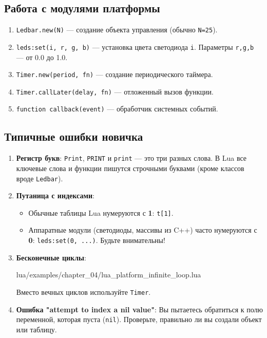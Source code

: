\subsection{Работа с модулями платформы}
\begin{enumerate}
    \item \verb|Ledbar.new(N)| — создание объекта управления (обычно \verb|N=25|).
    \item \verb|leds:set(i, r, g, b)| — установка цвета светодиода \verb|i|. Параметры \verb|r,g,b| — от 0.0 до 1.0.
    \item \verb|Timer.new(period, fn)| — создание периодического таймера.
    \item \verb|Timer.callLater(delay, fn)| — отложенный вызов функции.
    \item \verb|function callback(event)| — обработчик системных событий.
\end{enumerate}

\subsection{Типичные ошибки новичка}
\begin{enumerate}
    \item \textbf{Регистр букв}: \texttt{Print}, \texttt{PRINT} и \texttt{print} — это три разных слова. В Lua все ключевые слова и функции пишутся строчными буквами (кроме классов вроде \texttt{Ledbar}).
    \item \textbf{Путаница с индексами}:
    \begin{itemize}
        \item Обычные таблицы Lua нумеруются с \textbf{1}: \texttt{t[1]}.
        \item Аппаратные модули (светодиоды, массивы из C++) часто нумеруются с \textbf{0}: \texttt{leds:set(0, ...)}. Будьте внимательны!
    \end{itemize}
    \item \textbf{Бесконечные циклы}:
    \begin{codefile}{lua/examples/chapter_04/lua_platform_infinite_loop.lua}
    \end{codefile}
    Вместо вечных циклов используйте \texttt{Timer}.
    \item \textbf{Ошибка "attempt to index a nil value"}: Вы пытаетесь обратиться к полю переменной, которая пуста (\texttt{nil}). Проверьте, правильно ли вы создали объект или таблицу.
\end{enumerate}

